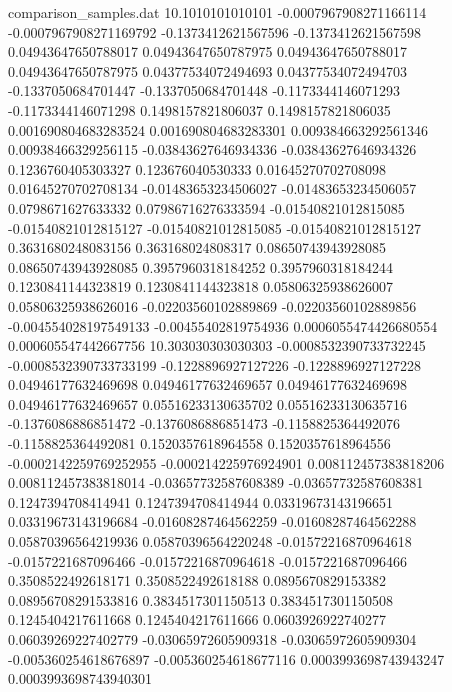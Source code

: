 \begin{filecontents}{comparison_samples.dat}
10.1010101010101    -0.0007967908271166114  -0.0007967908271169792  -0.1373412621567596    -0.1373412621567598    0.04943647650788017    0.04943647650787975    0.04943647650788017    0.04943647650787975    0.04377534072494693    0.04377534072494703    -0.1337050684701447     -0.1337050684701448     -0.1173344146071293    -0.1173344146071298    0.1498157821806037      0.1498157821806035      0.001690804683283524    0.001690804683283301    0.009384663292561346    0.00938466329256115     -0.03843627646934336    -0.03843627646934326    0.1236760405303327      0.123676040530333       0.01645270702708098     0.01645270702708134     -0.01483653234506027   -0.01483653234506057   0.0798671627633332     0.07986716276333594    -0.01540821012815085    -0.01540821012815127    -0.01540821012815085    -0.01540821012815127    0.3631680248083156     0.363168024808317      0.08650743943928085     0.08650743943928085     0.3957960318184252     0.3957960318184244     0.1230841144323819      0.1230841144323818      0.05806325938626007     0.05806325938626016     -0.02203560102889869   -0.02203560102889856   -0.004554028197549133  -0.00455402819754936   0.0006055474426680554   0.000605547442667756  
10.303030303030303  -0.0008532390733732245  -0.0008532390733733199  -0.1228896927127226    -0.1228896927127228    0.04946177632469698    0.04946177632469657    0.04946177632469698    0.04946177632469657    0.05516233130635702    0.05516233130635716    -0.1376086886851472     -0.1376086886851473     -0.1158825364492076    -0.1158825364492081    0.1520357618964558      0.1520357618964556      -0.0002142259769252955  -0.000214225976924901   0.008112457383818206    0.008112457383818014    -0.03657732587608389    -0.03657732587608381    0.1247394708414941      0.1247394708414944      0.03319673143196651     0.03319673143196684     -0.01608287464562259   -0.01608287464562288   0.05870396564219936    0.05870396564220248    -0.01572216870964618    -0.0157221687096466     -0.01572216870964618    -0.0157221687096466     0.3508522492618171     0.3508522492618188     0.0895670829153382      0.08956708291533816     0.3834517301150513     0.3834517301150508     0.1245404217611668      0.1245404217611666      0.0603926922740277      0.06039269227402779     -0.03065972605909318   -0.03065972605909304   -0.005360254618676897  -0.005360254618677116  0.0003993698743943247   0.0003993698743940301 

\end{filecontents}
